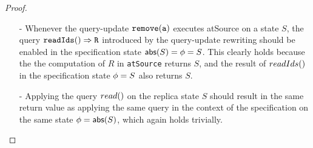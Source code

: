 \begin {proof}
\begin{itemize}
\begin{itemize}
    Let us prove $S' = \abstate'$ by contradiction.

        \begin{itemize}
        \setlength{\itemsep}{0.5pt}
        \item[-] If there exists item $(c,V'')$ in $\abstate'$ but not in $S'$: we can see that $(c,V'') \in S$, $(c,V'') \notin S_1$, and $(c,V'') \in S_2$.

        Let $\alabel_c$ be the operation that generates effector $(c,V'')$. Since $(c,V'') \notin S_1$, we know that there exists a {\tt write} operation $\alabel_1$, such that $(\alabel_c,\alabel_1)$, $(\alabel_1,\alabel) \in \avisord$. Since $(c,V'') \in S$, we can see that the effector of $\alabel_1$ has not been applied yet in the replica of $S$, and also the effector of $\alabel_1$ has not been applied yet in the replica of $S'$, while in $S'$, the downstream of $\alabel$ has been applied. Since $(\alabel_1,\alabel) \in \avisord$, we can see that this violates the causal delivery assumption.

        \item[-] If there exists item $(c,V'')$ in $S'$ but not in $\abstate'$: we can see that $(c,V'') \in S$, $(c,V'') \notin S_2$, and $(c,V'') \in S_1$.

        Let $\alabel_c$ be the operation that generates effector $(c,V'')$ Since $(c,V'') \notin S_2$, we know that $\neg(V'' < V')$. Since $(c,V'') \in S_1$, we know that $(\alabel_c,\alabel) \in \avisord$. This contradicts $fact1$ and $fact2$.
        \end{itemize}

    Therefore, we know that $S' = \abstate'$, and the case of the effector $(a,V')$ and the $\alabelshort[{\tt write}]{a,V',S_1}$ operation of the specification $\specMVReg$ holds.

    \item[-] Whenever the query-update $\alabelshort[{\tt remove}]{a}$ executes atSource on a state $S$, the query $\alabellong[{\tt readIds}]{}{R}{}$ introduced by the query-update rewriting should be enabled in the specification state $\refmap(S)=\abstate=S$. This clearly holds because the the computation of $R$ in {\tt atSource} returns $S$, and the result of $\alabelshort[readIds]{}$ in the specification state $\abstate = S$ also returns $S$.

    \item[-] Applying the query $\alabelshort[read]{}$ on the replica state $S$ should result in the same return value as applying the same query in the context of the specification on the same state $\abstate = \refmap(S)$, which again holds trivially.
    \end{itemize}


\end{itemize}
\end{proof}
